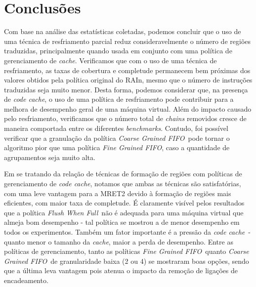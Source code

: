 \documentclass[12pt,twoside]{article}
\newcommand{\ccache}{\emph{code cache}}
\newcommand{\cache}{\emph{cache}}
\newcommand{\benchmarks}{\emph{benchmarks}}
\newcommand{\flush}{\emph{Flush When Full}}
\newcommand{\finefifo}{\emph{Fine Grained FIFO}}
\newcommand{\coarsefifo}{\emph{Coarse Grained FIFO}}
\begin{document}
\section{Conclusões}
Com base na análise das estatísticas coletadas, podemos concluir que o uso de uma técnica de resfriamento parcial reduz consideravelmente o número de regiões traduzidas, principalmente quando usada em conjunto com uma política de gerenciamento de \cache. Verificamos que com o uso de uma técnica de resfriamento, as taxas de cobertura e completude permanecem bem próximas dos valores obtidos pela política original do RAIn, mesmo que o número de instruções traduzidas seja muito menor. Desta forma, podemos considerar que, na presença de \ccache, o uso de uma política de resfriamento pode contribuir para a melhora de desempenho geral de uma máquina virtual.
Além do impacto causado pelo resfriamento, verificamos que o número total de \emph{chains} removidos cresce de maneira comportada entre os diferentes \benchmarks. Contudo, foi possível verificar que a granulação da política \coarsefifo~pode tornar o algoritmo pior que uma política \finefifo, caso a quantidade de agrupamentos seja muito alta.

Em se tratando da relação de técnicas de formação de regiões com políticas de gerenciamento de \ccache, notamos que ambas as técnicas são satisfatórias, com uma leve vantagem para a MRET2 devido à formação de regiões mais eficientes, com maior taxa de completude. É claramente visível pelos resultados que a política \flush~não é adequada para uma máquina virtual que almeja bom desempenho - tal política se mostrou a de menor desempenho em todos os experimentos. Também um fator importante é a pressão da \ccache~- quanto menor o tamanho da \cache, maior a perda de desempenho. Entre as políticas de gerenciamento, tanto as políticas \finefifo~quanto \coarsefifo~de granularidade baixa (2 ou 4) se mostraram boas opções, sendo que a última leva vantagem pois atenua o impacto da remoção de ligações de encadeamento\cite{kim-2004}.




\end{document}
